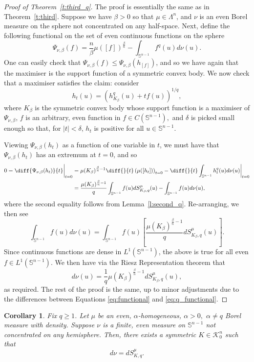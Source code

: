 \documentclass[11pt]{amsart}
\newtheorem{corollary}[theorem]{Corollary}
\theoremstyle{definition}
\theoremstyle{remark}
\numberwithin{equation}{section}
\newcommand{\s}{\mathbb{S}}
\newcommand{\conbod}{\mathcal{K}^n}
\begin{document}
	\begin{proof}[Proof of Theorem~\ref{t:third_q}]
	The proof is essentially the same as in Theorem~\ref{t:third}. Suppose we have $\beta>0$ so that $\mu\in\Lambda^n$, and $\nu$ is an even Borel measure on the sphere not concentrated on any half-space. Next, define the following functional on the set of even continuous functions on the sphere
	\begin{equation}
	    \label{eq:q_functional}
	    \Psi_{\nu,\beta}(f)=\frac{n}{\beta}\mu\left([f]\right)^\frac{\beta}{n}-\int_{\s^{n-1}}f^q(u)d\nu(u).
	\end{equation}
	One can easily check that $\Psi_{\nu,\beta}(f)\leq \Psi_{\nu,\beta}(h_{[f]})$, and so we have again that the maximiser is the support function of a symmetric convex body. We now check that a maximiser satisfies the claim: consider $$h_t(u)=\left(h^q_{K_\beta}(u)+tf(u)\right)^{1/q},$$ where $K_\beta$ is the symmetric convex body whose support function is a maximiser of $\Psi_{\nu,\beta}$, $f$ is an arbitrary, even function in $f\in C(\s^{n-1}),$ and $\delta$ is picked small enough so that, for $|t|<\delta$, $h_t$ is positive for all $u\in\s^{n-1}$.
	
Viewing $\Psi_{\nu,\beta}(h_t)$ as a function of one variable in $t$, we must have that $\Psi_{\nu,\beta}(h_t)$ has an extremum at $t=0$, and so
\begin{align*}0=\diff{\Psi_{\nu,\beta}(h_t)}{t}\bigg|_{t=0}&=\mu(K_\beta)^{\frac{\beta}{n}-1}\diff{}{t}\left(\mu([h_t])\right)_{t=0}-\diff{}{t}\int_{\s^{n-1}}h^q_{t}(u)d\nu(u)\bigg|_{t=0}
\\
&=\frac{\mu(K_\beta)^{\frac{\beta}{n}-1}}{q}\int_{\s^{n-1}}f(u)dS^{\mu}_{K_{\beta},q}(u)-\int_{\s^{n-1}}f(u)d\nu(u),\end{align*}
where the second equality follows from Lemma~\ref{l:second_q}.
Re-arranging, we then see
$$\int_{\s^{n-1}}f(u)d\nu(u)=\int_{\s^{n-1}}f(u)\left[\frac{\mu(K_\beta)^{\frac{\beta}{n}-1}}{q}dS^{\mu}_{K_{\beta},q}(u)\right].$$
Since continuous functions are dense in $L^1(\s^{n-1})$, the above is true for all even $f\in L^1(\s^{n-1})$. We then have via the Riesz Representation theorem that
$$d\nu(u)=\frac{1}{q}\mu(K_\beta)^{\frac{\beta}{n}-1}dS^{\mu}_{K_{\beta},q}(u),$$
as required. The rest of the proof is the same, up to minor adjustments due to the differences between Equations \ref{eq:functional} and \ref{eq:q_functional}.
\end{proof}
\begin{corollary}
\label{cor:almost_hom_q}
Fix $q\geq 1$. Let $\mu$ be an even, $\alpha$-homogeneous, $\alpha > 0,$ $\alpha\neq q$ Borel measure with density. Suppose $\nu$ is a finite, even measure on $\s^{n-1}$ not concentrated on any hemisphere. Then, there exists a symmetric $K\in\conbod_0$ such that
$$d\nu=dS^{\mu}_{K,q}.$$
\end{corollary}
\end{document}
